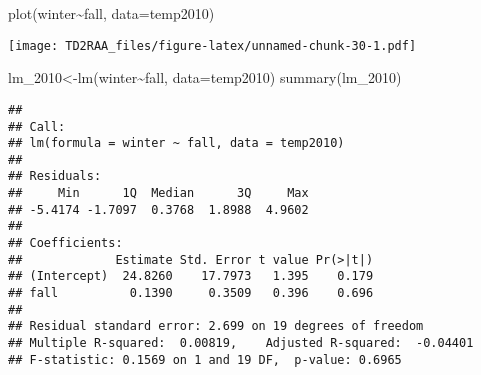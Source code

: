 \documentclass[
]{article}
\newenvironment{Shaded}{\begin{snugshade}}{\end{snugshade}}
\newcommand{\AttributeTok}[1]{\textcolor[rgb]{0.77,0.63,0.00}{#1}}
\newcommand{\FunctionTok}[1]{\textcolor[rgb]{0.00,0.00,0.00}{#1}}
\newcommand{\NormalTok}[1]{#1}
\newcommand{\OtherTok}[1]{\textcolor[rgb]{0.56,0.35,0.01}{#1}}
\newcommand{\SpecialCharTok}[1]{\textcolor[rgb]{0.00,0.00,0.00}{#1}}
\begin{document}
\begin{Shaded}
\begin{Highlighting}[]
\FunctionTok{plot}\NormalTok{(winter}\SpecialCharTok{\textasciitilde{}}\NormalTok{fall, }\AttributeTok{data=}\NormalTok{temp2010)}
\end{Highlighting}
\end{Shaded}

\texttt{[image: TD2RAA\_files/figure-latex/unnamed-chunk-30-1.pdf]}

\begin{Shaded}
\begin{Highlighting}[]
\NormalTok{lm\_2010}\OtherTok{\textless{}{-}}\FunctionTok{lm}\NormalTok{(winter}\SpecialCharTok{\textasciitilde{}}\NormalTok{fall, }\AttributeTok{data=}\NormalTok{temp2010)}
\FunctionTok{summary}\NormalTok{(lm\_2010)}
\end{Highlighting}
\end{Shaded}

\begin{verbatim}
## 
## Call:
## lm(formula = winter ~ fall, data = temp2010)
## 
## Residuals:
##     Min      1Q  Median      3Q     Max 
## -5.4174 -1.7097  0.3768  1.8988  4.9602 
## 
## Coefficients:
##             Estimate Std. Error t value Pr(>|t|)
## (Intercept)  24.8260    17.7973   1.395    0.179
## fall          0.1390     0.3509   0.396    0.696
## 
## Residual standard error: 2.699 on 19 degrees of freedom
## Multiple R-squared:  0.00819,    Adjusted R-squared:  -0.04401 
## F-statistic: 0.1569 on 1 and 19 DF,  p-value: 0.6965
\end{verbatim}
\end{document}
